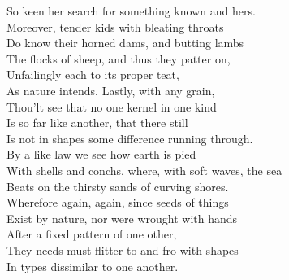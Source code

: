 So keen her search for something known and hers.\\
Moreover, tender kids with bleating throats\\
Do know their horned dams, and butting lambs\\
The flocks of sheep, and thus they patter on,\\
Unfailingly each to its proper teat,\\
As nature intends. Lastly, with any grain,\\
Thou'lt see that no one kernel in one kind\\
Is so far like another, that there still\\
Is not in shapes some difference running through.\\
By a like law we see how earth is pied\\
With shells and conchs, where, with soft waves, the sea\\
Beats on the thirsty sands of curving shores.\\
Wherefore again, again, since seeds of things\\
Exist by nature, nor were wrought with hands\\
After a fixed pattern of one other,\\
They needs must flitter to and fro with shapes\\
In types dissimilar to one another.

